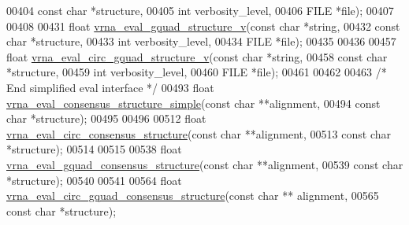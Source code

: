 \begin{DoxyCode}
00404                                  \textcolor{keyword}{const} \textcolor{keywordtype}{char} *structure,
00405                                  \textcolor{keywordtype}{int}        verbosity\_level,
00406                                  FILE       *file);
00407 
00408 
00431 \textcolor{keywordtype}{float} \hyperlink{group__eval_gaeaa2bdbc1b5d78c667e735fbdff87fff}{vrna\_eval\_gquad\_structure\_v}(\textcolor{keyword}{const} \textcolor{keywordtype}{char}  *\textcolor{keywordtype}{string},
00432                                   \textcolor{keyword}{const} \textcolor{keywordtype}{char}  *structure,
00433                                   \textcolor{keywordtype}{int}         verbosity\_level,
00434                                   FILE        *file);
00435 
00436 
00457 \textcolor{keywordtype}{float} \hyperlink{group__eval_gab96a6c59923ff06c35f8c2fd2c239727}{vrna\_eval\_circ\_gquad\_structure\_v}(\textcolor{keyword}{const} \textcolor{keywordtype}{char} *\textcolor{keywordtype}{string},
00458                                        \textcolor{keyword}{const} \textcolor{keywordtype}{char} *structure,
00459                                        \textcolor{keywordtype}{int}        verbosity\_level,
00460                                        FILE       *file);
00461 
00462 
00463 \textcolor{comment}{/* End simplified eval interface */}
00493 \textcolor{keywordtype}{float} \hyperlink{group__eval_ga7762c3a7bdcbc3a14ef93259d322c7d6}{vrna\_eval\_consensus\_structure\_simple}(\textcolor{keyword}{const} \textcolor{keywordtype}{char} **alignment,
00494                                            \textcolor{keyword}{const} \textcolor{keywordtype}{char} *structure);
00495 
00496 
00512 \textcolor{keywordtype}{float} \hyperlink{group__eval_gac96577cf232c71160f762737a994b7c6}{vrna\_eval\_circ\_consensus\_structure}(\textcolor{keyword}{const} \textcolor{keywordtype}{char} **alignment,
00513                                          \textcolor{keyword}{const} \textcolor{keywordtype}{char} *structure);
00514 
00515 
00538 \textcolor{keywordtype}{float} \hyperlink{group__eval_gaf09a326b3d57a4b30c27bd0e216198ac}{vrna\_eval\_gquad\_consensus\_structure}(\textcolor{keyword}{const} \textcolor{keywordtype}{char}  **alignment,
00539                                           \textcolor{keyword}{const} \textcolor{keywordtype}{char}  *structure);
00540 
00541 
00564 \textcolor{keywordtype}{float} \hyperlink{group__eval_gac673ebb9ae2a29f54d201e2ac5b85540}{vrna\_eval\_circ\_gquad\_consensus\_structure}(\textcolor{keyword}{const} \textcolor{keywordtype}{char} **
      alignment,
00565                                                \textcolor{keyword}{const} \textcolor{keywordtype}{char} *structure);

\end{DoxyCode}
